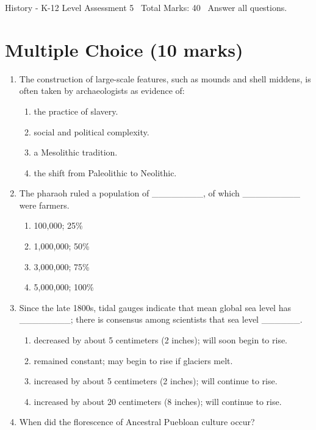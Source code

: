\documentclass[12pt]{article}
\begin{document}
\begin{center}
History - K-12 Level Assessment 5 \
Total Marks: 40 \
Answer all questions.
\end{center}

\section*{Multiple Choice (10 marks)}
\begin{enumerate}[label=\arabic*.]
\item The construction of large-scale features, such as mounds and shell middens, is often taken
by archaeologists as evidence of:
\begin{enumerate}[label=(\alph*)]
    \item the practice of slavery.
    \item social and political complexity.
    \item a Mesolithic tradition.
    \item the shift from Paleolithic to Neolithic.
\end{enumerate}
\item The pharaoh ruled a population of \_\_\_\_\_\_\_\_, of which \_\_\_\_\_\_\_\_\_ were farmers.
\begin{enumerate}[label=(\alph*)]
    \item 100,000; 25\%
    \item 1,000,000; 50\%
    \item 3,000,000; 75\%
    \item 5,000,000; 100\%
\end{enumerate}
\item Since the late 1800s, tidal gauges indicate that mean global sea level has \_\_\_\_\_\_\_\_; there
is consensus among scientists that sea level \_\_\_\_\_\_.
\begin{enumerate}[label=(\alph*)]
    \item decreased by about 5 centimeters (2 inches); will soon begin to rise.
    \item remained constant; may begin to rise if glaciers melt.
    \item increased by about 5 centimeters (2 inches); will continue to rise.
    \item increased by about 20 centimeters (8 inches); will continue to rise.
\end{enumerate}
\item When did the florescence of Ancestral Puebloan culture occur?
\begin{enumerate}[label=(\alph*)]

\end{enumerate}
\end{enumerate}
\end{document}

